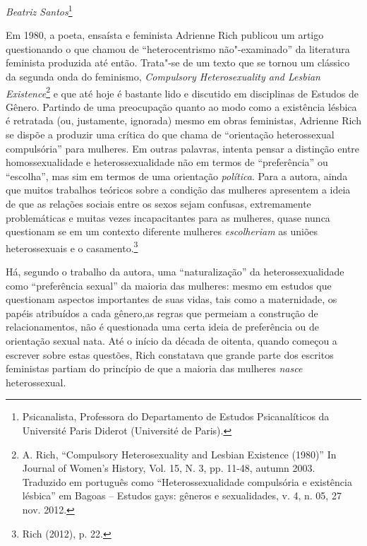 \begin{flushright}
\emph{Beatriz Santos}\footnote{Psicanalista, Professora do Departamento de Estudos Psicanalíticos da Université Paris Diderot (Université de Paris).}
\end{flushright}


Em 1980, a poeta, ensaísta e feminista Adrienne Rich publicou um artigo
questionando o que chamou de ``heterocentrismo não"-examinado'' da
literatura feminista produzida até então. Trata"-se de um texto que se
tornou um clássico da segunda onda do feminismo, \emph{Compulsory
Heterosexuality and Lesbian Existence}\footnote{A. Rich, ``Compulsory
  Heterosexuality and Lesbian Existence (1980)'' In Journal of Women's
  History, Vol. 15, N. 3, pp. 11-48, autumn 2003.
  Traduzido em português como ``Heterossexualidade compulsória e
  existência lésbica'' em Bagoas -- Estudos gays: gêneros e sexualidades,
  v. 4, n. 05, 27 nov. 2012.} e que até hoje é bastante lido e discutido
em disciplinas de Estudos de Gênero. Partindo de uma preocupação quanto
ao modo como a existência lésbica é retratada (ou, justamente, ignorada)
mesmo em obras feministas, Adrienne Rich se dispõe a produzir uma
crítica do que chama de ``orientação heterossexual compulsória'' para
mulheres. Em outras palavras, intenta pensar a distinção entre
homossexualidade e heterossexualidade não em termos de ``preferência''
ou ``escolha'', mas sim em termos de uma orientação \emph{política}.
Para a autora, ainda que muitos trabalhos teóricos sobre a condição das
mulheres apresentem a ideia de que as relações sociais entre os sexos
sejam confusas, extremamente problemáticas e muitas vezes incapacitantes
para as mulheres, quase nunca questionam se em um contexto diferente
mulheres \emph{escolheriam} as uniões heterossexuais e o
casamento.\footnote{Rich (2012), p. 22.}

Há, segundo o trabalho da autora, uma ``naturalização'' da
heterossexualidade como ``preferência sexual'' da maioria das mulheres:
mesmo em estudos que questionam aspectos importantes de suas vidas, tais
como a maternidade, os papéis atribuídos a cada gênero,as regras que
permeiam a construção de relacionamentos, não é questionada uma certa
ideia de preferência ou de orientação sexual nata. Até o início da
década de oitenta, quando começou a escrever sobre estas questões, Rich
constatava que grande parte dos escritos feministas partiam do princípio
de que a maioria das mulheres \emph{nasce} heterossexual.

